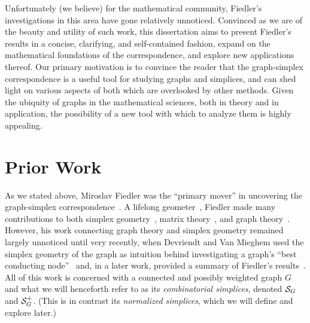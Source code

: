 Unfortunately (we believe) for  the mathematical community,  Fiedler's investigations in this area  have  gone relatively unnoticed. Convinced as we are of  the beauty and  utility of such  work, this dissertation aims to present Fiedler's  results in a concise, clarifying, and self-contained fashion,  expand on the mathematical  foundations of the correspondence, and explore new applications thereof. Our primary motivation is to convince the reader that the graph-simplex correspondence is a  useful tool for studying graphs and simplices,  and can shed light on various  aspects of both which are  overlooked by other  methods. Given the ubiquity of graphs in the mathematical  sciences, both in theory and in application, the possibility of a new tool with which to analyze them is highly  appealing. 



\section{Prior Work}
\label{sec:intro_prior_work}


As we stated  above, Miroslav Fiedler was the ``primary  mover''  in  uncovering the graph-simplex correspondence~\cite{fiedler1993geometric,fiedler2005geometry,fiedler2011matrices}. 
A lifelong geometer~\cite{vavvrin1995miroslav},  Fiedler made many contributions to both simplex geometry~\cite{fiedler1954geometry,fiedler1955geometry,fiedler1956geometry}, matrix theory~\cite{fiedler1998some,fiedler1995moore}, and graph theory~\cite{fiedler1973algebraic,  fiedler1975property, fiedler1976aggregation, fiedler1989laplacian}. 
However, his work connecting graph  theory and simplex geometry remained largely unnoticed until very recently, when Devriendt and Van Mieghem used the simplex geometry of the graph as intuition behind investigating  a graph's ``best conducting node''~\cite{van2017pseudoinverse} and, in a later work, provided a summary  of Fiedler's results~\cite{devriendt2018simplex}. All of this work is concerned  with a connected and possibly  weighted graph $G$ and what we will henceforth  refer to as its  \emph{combinatorial simplices},  denoted $\mathcal{S}_G$ and $\mathcal{S}_G^+$. (This is in contrast its \emph{normalized simplices}, which we  will define and explore later.) 

